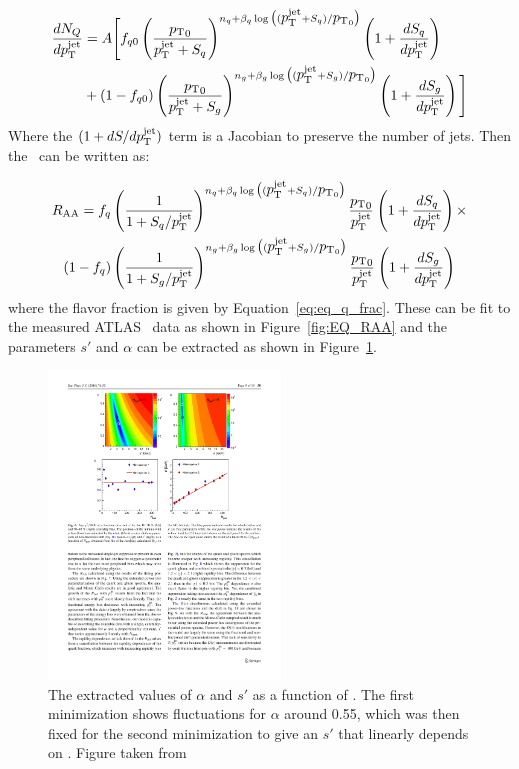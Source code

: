 \begin{align}
 \frac{dN_Q}{d\mbox{$p_{\mathrm{T}}^{\mathrm{jet}}$}} &= A \Bigg[ f_{q0} \left( \frac{\mbox{$p_{\mathrm{T}}$}_0}{\mbox{$p_{\mathrm{T}}^{\mathrm{jet}}$}+S_q} \right)^{n_q+ \beta_q \log\big((\mbox{$p_{\mathrm{T}}^{\mathrm{jet}}$}+S_q) / \mbox{$p_{\mathrm{T}}$}_0\big)} \left(1 + \frac{dS_q}{d\mbox{$p_{\mathrm{T}}^{\mathrm{jet}}$}} \right) \\
& + (1-f_{q0}) \left( \frac{\mbox{$p_{\mathrm{T}}$}_0}{\mbox{$p_{\mathrm{T}}^{\mathrm{jet}}$}+S_g} \right)^{n_g + \beta_g \log\big((\mbox{$p_{\mathrm{T}}^{\mathrm{jet}}$}+S_g) / \mbox{$p_{\mathrm{T}}$}_0\big)}  \left(1 + \frac{dS_g}{d\mbox{$p_{\mathrm{T}}^{\mathrm{jet}}$}} \right) \Bigg] \nonumber
\end{align}
Where the $(1+dS/d\mbox{$p_{\mathrm{T}}^{\mathrm{jet}}$})$ term is a Jacobian to preserve the number of jets. 
Then the \RAA\ can be written as:

\begin{align}
\mbox{$R_{\rm AA}$} = f_q & \left(\frac{1}{1 + S_q / \mbox{$p_{\mathrm{T}}^{\mathrm{jet}}$}}\right) ^{n_q + \beta_q \log\big((\mbox{$p_{\mathrm{T}}^{\mathrm{jet}}$}+S_q)/\mbox{$p_{\mathrm{T}}$}_0\big)}  \frac{\mbox{$p_{\mathrm{T}}$}_0}{\mbox{$p_{\mathrm{T}}^{\mathrm{jet}}$}}^{} \left( 1+ \frac{dS_q}{d\mbox{$p_{\mathrm{T}}^{\mathrm{jet}}$}} \right) \times  \\
 (1-f_q) & \left(\frac{1}{1 + S_g / \mbox{$p_{\mathrm{T}}^{\mathrm{jet}}$}}\right) ^{n_g + \beta_g \log\big((\mbox{$p_{\mathrm{T}}^{\mathrm{jet}}$}+S_g)/\mbox{$p_{\mathrm{T}}$}_0\big)}  \frac{\mbox{$p_{\mathrm{T}}$}_0}{\mbox{$p_{\mathrm{T}}^{\mathrm{jet}}$}}^{} \left( 1+ \frac{dS_g}{d\mbox{$p_{\mathrm{T}}^{\mathrm{jet}}$}} \right)  \nonumber \\
\end{align}
where the flavor fraction is given by Equation~\ref{eq:eq_q_frac}. These can be fit to the measured ATLAS \RAA\ data as shown in Figure~\ref{fig:EQ_RAA} and the parameters $s'$ and $\alpha$ can be extracted as shown in Figure~\ref{fig:eq_param}. 

\begin{figure}[htbp]
\begin{center}
\includegraphics[width=0.55\textwidth]{figures/jetMeasurements/EQ_fitQuality}
\caption{The extracted values of $\alpha$ and $s'$ as a function of \Npart. The first minimization shows fluctuations for $\alpha$ around 0.55, which was then fixed for the second minimization to give an $s'$ that linearly depends on \Npart. Figure taken from \cite{Spousta:2015fca}}
\label{fig:eq_param}
\end{center}
\end{figure}

